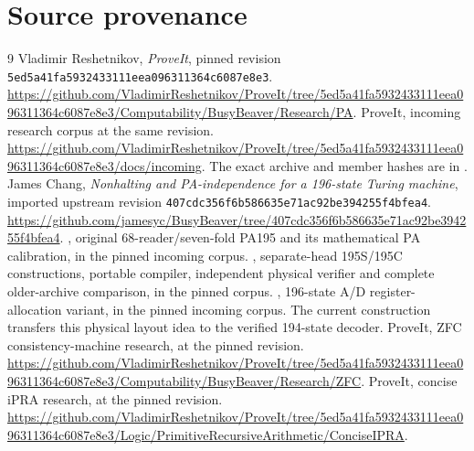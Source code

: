 \section{Source provenance}

\begin{thebibliography}{9}
Vladimir Reshetnikov, \emph{ProveIt}, pinned revision
\nolinkurl{5ed5a41fa5932433111eea096311364c6087e8e3}.
\url{https://github.com/VladimirReshetnikov/ProveIt/tree/5ed5a41fa5932433111eea096311364c6087e8e3/Computability/BusyBeaver/Research/PA}.
ProveIt, incoming research corpus at the same revision.
\url{https://github.com/VladimirReshetnikov/ProveIt/tree/5ed5a41fa5932433111eea096311364c6087e8e3/docs/incoming}.
The exact archive and member hashes are in .
James Chang, \emph{Nonhalting and PA-independence for a 196-state Turing machine},
imported upstream revision \nolinkurl{407cdc356f6b586635e71ac92be394255f4bfea4}.
\url{https://github.com/jamesyc/BusyBeaver/tree/407cdc356f6b586635e71ac92be394255f4bfea4}.
, original 68-reader/seven-fold PA195 and
its mathematical PA calibration, in the pinned incoming corpus.
, separate-head 195S/195C
constructions, portable compiler, independent physical verifier and
complete older-archive comparison, in the pinned corpus.
, 196-state A/D register-allocation
variant, in the pinned incoming corpus. The current construction transfers
this physical layout idea to the verified 194-state decoder.
ProveIt, ZFC consistency-machine research, at the pinned revision.
\url{https://github.com/VladimirReshetnikov/ProveIt/tree/5ed5a41fa5932433111eea096311364c6087e8e3/Computability/BusyBeaver/Research/ZFC}.
ProveIt, concise iPRA research, at the pinned revision.
\url{https://github.com/VladimirReshetnikov/ProveIt/tree/5ed5a41fa5932433111eea096311364c6087e8e3/Logic/PrimitiveRecursiveArithmetic/ConciseIPRA}.
\end{thebibliography}

